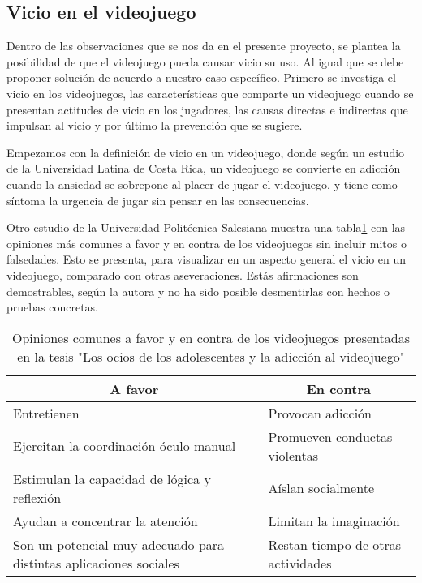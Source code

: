 \subsection{Vicio en el videojuego}\label{vicioVJ}


Dentro de las observaciones que se nos da en el presente proyecto, se plantea la posibilidad de que el videojuego pueda causar vicio su uso. Al igual que se debe proponer solución de acuerdo a nuestro caso específico. Primero se investiga el vicio en los videojuegos, las características que comparte un videojuego cuando se presentan actitudes de vicio en los jugadores, las causas directas e indirectas que impulsan al vicio y por último la prevención que se sugiere.

Empezamos con la definición de vicio en un videojuego, donde según un estudio de la Universidad Latina de Costa Rica\cite{quinteroscaracteristicas}, 
un videojuego se convierte en adicción cuando la ansiedad se sobrepone al placer de jugar el videojuego,
y tiene como síntoma la urgencia de jugar sin pensar en las consecuencias.

Otro estudio de la Universidad Politécnica Salesiana \cite{montero2014ocios}
muestra una tabla\ref{tab:tablaOpinión} con las opiniones más comunes a favor 
y en contra de los videojuegos sin incluir mitos o falsedades. Esto se presenta, para visualizar en un aspecto general el vicio en un videojuego, comparado con otras aseveraciones. 
Estás afirmaciones son demostrables, según la autora y no ha sido posible desmentirlas 
con hechos o pruebas concretas.


\begin{table}[]
	\centering
\caption{Opiniones comunes a favor y en contra de los videojuegos presentadas en la tesis "Los ocios de los adolescentes y la adicción al videojuego" \cite{montero2014ocios} }
\label{tab:tablaOpinión}
	\begin{tabular}{|l|l|}
		\hline
		\multicolumn{1}{|c|}{\textbf{A favor}}                             & \multicolumn{1}{c|}{\textbf{En contra}} \\ \hline
		Entretienen                                                        & Provocan adicción                       \\ \hline
		Ejercitan la coordinación óculo-manual                             & Promueven conductas violentas           \\ \hline
		Estimulan la capacidad de lógica y reflexión                       & Aíslan socialmente                      \\ \hline
		Ayudan a concentrar la atención                                    & Limitan la imaginación                  \\ \hline
		Son un potencial muy adecuado para distintas aplicaciones sociales & Restan tiempo de otras actividades      \\ \hline
	\end{tabular}
\end{table}
	
